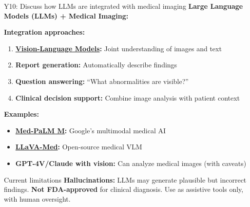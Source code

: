 \documentclass[aspectratio=169, 10pt]{beamer}
\begin{document}
\begin{frame}{Y10: Discuss how LLMs are integrated with medical imaging}
    \textbf{Large Language Models (LLMs) + Medical Imaging:}
    
    \vspace{0.2cm}
    \textbf{Integration approaches:}
    \begin{enumerate}
        \item \textbf{\href{https://en.wikipedia.org/wiki/Vision-language_model}{Vision-Language Models}:} Joint understanding of images and text
        \item \textbf{Report generation:} Automatically describe findings
        \item \textbf{Question answering:} ``What abnormalities are visible?''
        \item \textbf{Clinical decision support:} Combine image analysis with patient context
    \end{enumerate}
    
    \vspace{0.2cm}
    \textbf{Examples:}
    \begin{itemize}
        \item \textbf{\href{https://arxiv.org/abs/2306.00890}{Med-PaLM M}:} Google's multimodal medical AI
        \item \textbf{\href{https://arxiv.org/abs/2303.04048}{LLaVA-Med}:} Open-source medical VLM
        \item \textbf{GPT-4V/Claude with vision:} Can analyze medical images (with caveats)
    \end{itemize}
    
    {\small
    \begin{alertblock}{Current limitations}
        \textbf{Hallucinations:} LLMs may generate plausible but incorrect findings. \textbf{Not FDA-approved} for clinical diagnosis. Use as assistive tools only, with human oversight.
    \end{alertblock}
    }
\end{frame}
\end{document}
